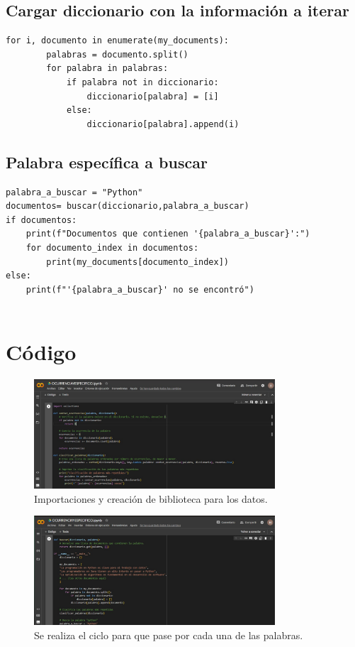 \documentclass[conference]{IEEEtran}
\begin{document}
\subsection{Cargar diccionario con la información a iterar}
\begin{verbatim}
for i, documento in enumerate(my_documents):
        palabras = documento.split()
        for palabra in palabras:
            if palabra not in diccionario:
                diccionario[palabra] = [i]
            else:
                diccionario[palabra].append(i)
\end{verbatim}

\subsection{Palabra específica a buscar}
\begin{verbatim}
palabra_a_buscar = "Python"
documentos= buscar(diccionario,palabra_a_buscar)
if documentos:
    print(f"Documentos que contienen '{palabra_a_buscar}':")
    for documento_index in documentos:
        print(my_documents[documento_index])
else:
    print(f"'{palabra_a_buscar}' no se encontró")
    
\end{verbatim}

\section{Código}

\begin{figure}[h]
  \centering
  \includegraphics[width=9cm]{WhatsApp Image 2023-09-11 at 9.14.40 PM.jpeg}
  \caption{Importaciones y creación de biblioteca para los datos.}
  \label{fig:importaciones}
\end{figure}

\begin{figure}[h]
  \centering
  \includegraphics[width=9cm]{WhatsApp Image 2023-09-11 at 9.14.58 PM.jpeg}
  \caption{Se realiza el ciclo para que pase por cada una de las palabras.}
  \label{fig:ciclo}
\end{figure}
\end{document}
